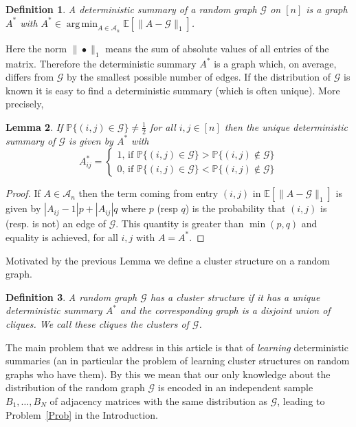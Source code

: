 \documentclass[12pt]{amsart}
\newtheorem{lemma}{Lemma}[section]
\newtheorem{definition}[lemma]{Definition}
\theoremstyle{remark}
\DeclareMathOperator*{\argmin}{arg\,min}
\newcommand{\PP}{\mathbb{P}}
\newcommand{\EE}{\mathbb{E}}
\newcommand{\grG}{{\mathcal{G}}}
\begin{document}
\begin{definition} A {\it deterministic summary} of a random graph $\grG$ on $[n]$ is a graph $A^*$ with $A^*\in \argmin_{A\in\mathcal{A}_n} \EE[\|A-\grG\|_1]$.
\end{definition}
Here the norm $\|\bullet\|_1$ means the sum of absolute values of all entries of the matrix. Therefore the deterministic summary $A^*$ is a graph which, on average, differs from $\grG$ by the smallest possible number of edges. If the distribution of $\grG$ is known it is easy to find a deterministic summary (which is often unique). More precisely,

\begin{lemma}\label{lem: withDist} If $\PP\{(i,j)\in \grG\}\neq \frac{1}{2}$ for all $i,j\in [n]$ then the unique deterministic summary of $\grG$ is given by $A^*$ with
\[A^*_{ij}=
\begin{cases}
1\text{, if $\PP\{(i,j)\in \grG\}> \PP\{(i,j)\not\in \grG\}$}\\
0\text{, if $\PP\{(i,j)\in \grG\}< \PP\{(i,j)\not\in \grG\}$}
\end{cases}\]
\end{lemma}
\begin{proof} If $A\in \mathcal{A}_n$ then the term coming from entry $(i,j)$ in $\EE[\|A-\grG\|_1]$ is given by $|A_{ij}-1|p+|A_{ij}|q$ where $p$ (resp $q$) is the probability that $(i,j)$ is (resp. is not) an edge of $\grG$. This quantity is greater than $\min(p,q)$ and equality is achieved, for all $i,j$ with $A=A^*$. 
\end{proof}

Motivated by the previous Lemma we define a cluster structure on a random graph.

\begin{definition} A random graph $\grG$ has a {\it cluster structure} if it has a unique deterministic summary $A^*$ and the corresponding graph is a disjoint union of cliques. We call these cliques the clusters of $\grG$.
\end{definition}

The main problem that we address in this article is that of {\it learning} deterministic summaries (an in particular the problem of learning cluster structures on random graphs who have them). By this we mean that our only knowledge about the distribution of the random graph $\grG$ is encoded in an independent sample $B_1,\dots, B_N$ of adjacency matrices with the same distribution as $\grG$, leading to Problem~\ref{Prob} in the Introduction. 
\end{document}

